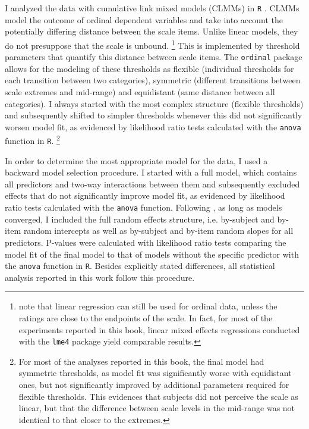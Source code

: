 I analyzed the data with cumulative link mixed models (CLMMs) \citep{christensen2015} in \texttt{R} \citep{rcoreteam2019}. CLMMs model the outcome of ordinal dependent variables and take into account the potentially differing distance between the scale items. Unlike linear models, they do not presuppose that the scale is unbound.%
%
\footnote{\citet[28]{gibson.etal2011} note that linear regression can still be used for ordinal data, unless the ratings are close to the endpoints of the scale. In fact, for most of the experiments reported in this book, linear mixed effects regressions conducted with the \texttt{lme4} package \citep{bates.etal2015} yield comparable results.}\afterfn%
%
This is implemented by threshold parameters that quantify this distance between scale items. The \texttt{ordinal} package allows for the modeling of these thresholds as flexible (individual thresholds for each transition between two categories), symmetric (different transitions between scale extremes and mid-range) and equidistant (same distance between all categories). I always started with the most complex structure (flexible thresholds) and subsequently shifted to simpler thresholds whenever this did not significantly worsen model fit, as evidenced by likelihood ratio tests calculated with the \texttt{anova} function in \texttt{R}.%
%
\footnote{For most of the analyses reported in this book, the final model had symmetric thresholds, as model fit was significantly worse with equidistant ones, but not significantly improved by additional parameters required for flexible thresholds. This evidences that subjects did not perceive the scale as linear, but that the difference between scale levels in the mid-range was not identical to that closer to the extremes.}\afterfn%
%

\largerpage
In order to determine the most appropriate model for the data, I used a backward model selection procedure. I started with a full model, which contains all predictors and two-way interactions between them and subsequently excluded effects that do not significantly improve model fit, as evidenced by likelihood ratio tests calculated with the \texttt{anova} function. Following \citet{barr.etal2013}, as long as models converged, I included the full random effects structure, i.e. by-subject and by-item random intercepts as well as by-subject and by-item random slopes for all predictors. P-values were calculated with likelihood ratio tests comparing the model fit of the final model to that of models without the specific predictor with the \texttt{anova} function in \texttt{R}. Besides explicitly stated differences, all statistical analysis reported in this work follow this procedure.


